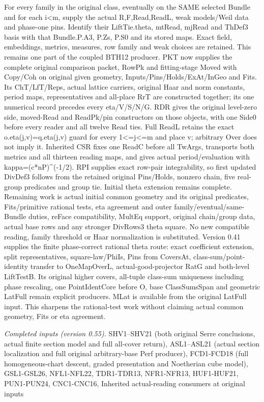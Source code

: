 \documentclass[11pt,a4paper]{article}
\numberwithin{equation}{section}
\theoremstyle{remark}\newtheorem{remark}[theorem]{Remark}
\begin{document}
For every family in the original class, eventually on the SAME selected Bundle and for each i<m, supply the actual R,F,Read,ReadL, weak models/Weil data and phase-one pins. Identify their LiftTie.theta, mtRead, mjRead and ThDef3 basis with that Bundle.P.A3, P.Zs, P.S0 and its stored maps. Exact field, embeddings, metrics, measures, row family and weak choices are retained. This remains one part of the coupled BTH12 producer. PKT now supplies the complete original comparison packet, RowPk and fitting-stage Moved with Copy/Coh on original given geometry, Inputs/Pins/Holds/ExAt/InGeo and Fits. Its ChT/LfT/Reps, actual lattice carriers, original Haar and norm constants, period maps, representatives and all-place RrT are constructed together; its one numerical record precedes every eta/V/S/N/G. RDR gives the original level-zero side, moved-Read and ReadPk/pin constructors on those objects, with one Side0 before every reader and all twelve Read ties. Full ReadL retains the exact o.eta(j,v)=q.eta(j,v) guard for every 1<=j<=m and place v; arbitrary Over does not imply it. Inherited CSR fixes one ReadC before all TwArgs, transports both metrics and all thirteen reading maps, and gives actual period/evaluation with kappa=(c*nP)\textasciicircum{}(-1/2). RPI supplies exact row-pair integrability, so first updated DivDef3 follows from the retained original Pins/Holds, nonzero chain, five real-group predicates and group tie. Initial theta extension remains complete. Remaining work is actual initial common geometry and its original predicates, Fits/primitive rational tests, eta agreement and outer family/eventual/same-Bundle duties, reFace compatibility, MultEq support, original chain/group data, actual base rows and any stronger DivRows3 theta square. No new compatible reading, family threshold or Haar normalization is substituted. Version 0.41 supplies the finite phase-correct rational theta route: exact coefficient extension, split representatives, square-law/PhiIs, Pins from CoversAt, class-sum/point-identity transfer to OneMapOverL, actual-good-projector RatG and both-level LiftTestB. Its original higher covers, all-tuple class-sum uniqueness including phase rescaling, one PointIdentCore before O, base ClassSumsSpan and geometric LatFull remain explicit producers. MLat is available from the original LatFull input. This sharpens the rational-test work without claiming actual common geometry, Fits or eta agreement.

\emph{Completed inputs (version 0.55).} SHV1–SHV21 (both original Serre conclusions, actual finite section model and full all-cover return), ASL1–ASL21 (actual section localization and full original arbitrary-base Perf producer), FCD1-FCD18 (full homogeneous-chart descent, graded presentation and Noetherian cube model), GSL1-GSL26, NFL1-NFL22, TDR1-TDR13, NFR1-NFR13, HUF1-HUF21, PUN1-PUN24, CNC1-CNC16, Inherited actual-reading consumers at original inputs
\end{document}
